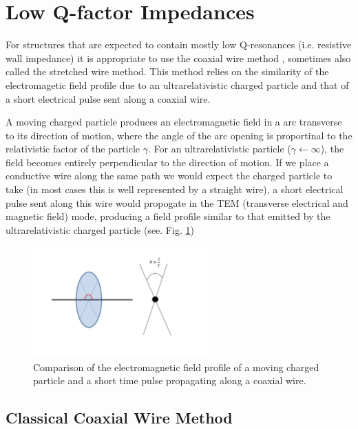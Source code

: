 \documentclass[review, number, sort&compress]{elsarticle}
\begin{document}
\section{Low Q-factor Impedances}
\label{sec:coax_wire_meth}

For structures that are expected to contain mostly low Q-resonances (i.e. resistive wall impedance) it is appropriate to use the coaxial wire method \cite{Gluckstern:WireMeasImp, Vaccaro:ImprovedWireMeth}, sometimes also called the stretched wire method. This method relies on the similarity of the electromagetic field profile due to an ultrarelativistic charged particle and that of a short electrical pulse sent along a coaxial wire. 

A moving charged particle produces an electromagnetic field in a arc transverse to its direction of motion, where the angle of the arc opening is proportinal to the relativistic factor of the particle $\gamma$. For an ultrarelativistic particle ($\gamma \leftarrow \infty$), the field becomes entirely perpendicular to the direction of motion. If we place a conductive wire along the same path we would expect the charged particle to take (in most cases this is well represented by a straight wire), a short electrical pulse sent along this wire would propogate in the TEM (transverse electrical and magnetic field) mode, producing a field profile similar to that emitted by the ultrarelativistic charged particle (see. Fig. \ref{fig:coax-part-profile})


\begin{figure}
\begin{center}
\includegraphics[width=0.6\textwidth]{figures/coaxial-particle-fields.pdf}
\end{center}
\caption{Comparison of the electromagnetic field profile of a moving charged particle and a short time pulse propagating along a coaxial wire.}
\label{fig:coax-part-profile}
\end{figure}

\subsection{Classical Coaxial Wire Method}
\end{document}
